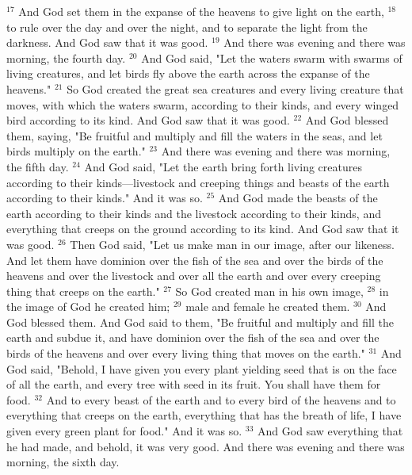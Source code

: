 \documentclass[10pt]{extarticle}
\begin{document}
    $^{17}$ And God set them in the expanse of the heavens to give light on the earth,
    $^{18}$ to rule over the day and over the night, and to separate the light from the darkness. And God saw that it was good.
    $^{19}$ And there was evening and there was morning, the fourth day.
    $^{20}$ And God said, "Let the waters swarm with swarms of living creatures, and let birds fly above the earth across the expanse of the heavens."
    $^{21}$ So God created the great sea creatures and every living creature that moves, with which the waters swarm, according to their kinds, and every winged bird according to its kind. And God saw that it was good.
    $^{22}$ And God blessed them, saying, "Be fruitful and multiply and fill the waters in the seas, and let birds multiply on the earth."
    $^{23}$ And there was evening and there was morning, the fifth day.
    $^{24}$ And God said, "Let the earth bring forth living creatures according to their kinds—livestock and creeping things and beasts of the earth according to their kinds." And it was so.
    $^{25}$ And God made the beasts of the earth according to their kinds and the livestock according to their kinds, and everything that creeps on the ground according to its kind. And God saw that it was good.
    $^{26}$ Then God said, "Let us make man in our image, after our likeness. And let them have dominion over the fish of the sea and over the birds of the heavens and over the livestock and over all the earth and over every creeping thing that creeps on the earth."
    $^{27}$ So God created man in his own image,
    $^{28}$ in the image of God he created him;
    $^{29}$ male and female he created them.
    $^{30}$ And God blessed them. And God said to them, "Be fruitful and multiply and fill the earth and subdue it, and have dominion over the fish of the sea and over the birds of the heavens and over every living thing that moves on the earth."
    $^{31}$ And God said, "Behold, I have given you every plant yielding seed that is on the face of all the earth, and every tree with seed in its fruit. You shall have them for food.
    $^{32}$ And to every beast of the earth and to every bird of the heavens and to everything that creeps on the earth, everything that has the breath of life, I have given every green plant for food." And it was so.
    $^{33}$ And God saw everything that he had made, and behold, it was very good. And there was evening and there was morning, the sixth day.
\end{document}
